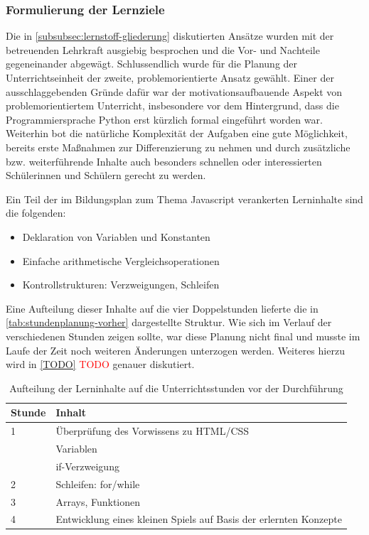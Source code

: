 \subsubsection{Formulierung der Lernziele}
\label{subsubsec:formulierung-lernziele}

Die in \autoref{subsubsec:lernstoff-gliederung} diskutierten Ansätze wurden mit der betreuenden Lehrkraft ausgiebig besprochen und die Vor- und Nachteile gegeneinander abgewägt.
Schlussendlich wurde für die Planung der Unterrichtseinheit der zweite, problemorientierte Ansatz gewählt.
Einer der  ausschlaggebenden Gründe dafür war der motivationsaufbauende Aspekt von problemorientiertem Unterricht, insbesondere vor dem Hintergrund, dass die Programmiersprache Python erst kürzlich formal eingeführt worden war.
Weiterhin bot die natürliche Komplexität der Aufgaben eine gute Möglichkeit, bereits erste Maßnahmen zur Differenzierung zu nehmen und durch zusätzliche bzw. weiterführende Inhalte auch besonders schnellen oder interessierten Schülerinnen und Schülern gerecht zu werden.

Ein Teil der im Bildungsplan zum Thema Javascript verankerten Lerninhalte \cite[BPE~19]{bildungsplan-tg-informatik} sind die folgenden:

\begin{itemize}
	\item Deklaration von Variablen und Konstanten
	\item Einfache arithmetische Vergleichsoperationen
	\item Kontrollstrukturen: Verzweigungen, Schleifen
\end{itemize}

Eine Aufteilung dieser Inhalte auf die vier Doppelstunden lieferte die in \autoref{tab:stundenplanung-vorher} dargestellte Struktur.
Wie sich im Verlauf der verschiedenen Stunden zeigen sollte, war diese Planung nicht final und musste im Laufe der Zeit noch weiteren Änderungen unterzogen werden.
Weiteres hierzu wird in \autoref{TODO} \textcolor{red}{TODO} genauer diskutiert.

\begin{table}[h!]
	\begin{tabular*}{\linewidth}{l|l}
		\hline
		\textbf{Stunde} & \textbf{Inhalt}\\
		\hline
		1 & Überprüfung des Vorwissens zu HTML/CSS\\
		& Variablen\\
		& if-Verzweigung\\
		\hline
		2 & Schleifen: for/while\\
		\hline
		3 & Arrays, Funktionen\\
		\hline
		4 & Entwicklung eines kleinen Spiels auf Basis der erlernten Konzepte\\
		\hline
	\end{tabular*}
	\caption{Aufteilung der Lerninhalte auf die Unterrichtsstunden vor der Durchführung}
	\label{tab:stundenplanung-vorher}
\end{table}

